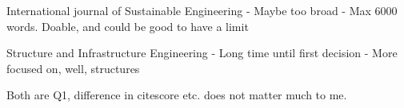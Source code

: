 International journal of Sustainable Engineering
- Maybe too broad
- Max 6000 words. Doable, and could be good to have a limit

Structure and Infrastructure Engineering
- Long time until first decision
- More focused on, well, structures

Both are Q1, difference in citescore etc. does not matter much to me.